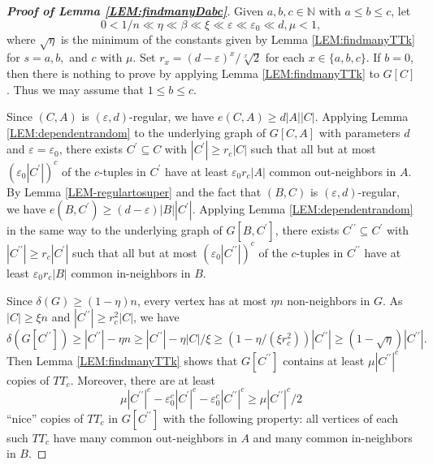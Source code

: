 \documentclass[11pt,a4paper,reqno]{amsart}
\theoremstyle{definition} %
\begin{document}
\begin{proof}[\textbf{Proof of Lemma \ref{LEM:findmanyDabc}}]
Given $a,b,c\in \mathbb{N}$ with $a\leqslant b \leqslant c$, let
$$0<1/n\ll \eta \ll \beta\ll \xi \ll \varepsilon\ll \varepsilon_0\ll d,\mu <1,$$
where $\sqrt \eta$ is the minimum of the constants given by Lemma \ref{LEM:findmanyTTk} for $s=a,b,$ and $c$ with $\mu$. Set $r_x=(d-\varepsilon)^x/\sqrt[x]{2}$ for each $x\in\{a,b,c\}$. If $b=0$, then there is nothing to prove by applying Lemma \ref{LEM:findmanyTTk} to $G[C]$. Thus we may  assume that $1\leqslant b\leqslant c$.
 
Since $(C,A)$ is $(\varepsilon,d)$-regular, we have $e(C,A) \geqslant d|A||C|$. Applying Lemma \ref{LEM:dependentrandom} to the underlying graph of $G[C,A]$ with parameters $d$ and $\varepsilon=\varepsilon_0$, there exists $C^{\prime}\subseteq C$ with $|C^{\prime}| \geqslant r_c |C|$ such that all but at most $(\varepsilon_0 |C^{\prime}|)^c$ of the $c$-tuples in $C^{\prime}$ have at least $\varepsilon_0 r_c |A|$ common out-neighbors in $A$. By Lemma \ref{LEM-regulartosuper} and the fact that $(B,C)$ is $(\varepsilon,d)$-regular, we have $e(B,C^{\prime})\geqslant (d-\varepsilon)|B||C^{\prime}|$. Applying Lemma \ref{LEM:dependentrandom} in the same way to the underlying graph of $G[B,C^\prime]$, there exists $C^{\prime\prime}\subseteq C^{\prime}$ with $|C^{\prime\prime}| \geqslant r_c |C^{\prime}|$ such that all but at most $(\varepsilon_0 |C^{\prime\prime}|)^c$ of the $c$-tuples in $C^{\prime\prime}$ have at least $\varepsilon_0 r_c |B|$ common in-neighbors in $B$.

Since $\delta(G)\geqslant (1-\eta)n$, every vertex has at most $\eta n$ non-neighbors in $G$. As $|C|\geqslant \xi n$ and $|C^{\prime\prime}|\geqslant r_c^2|C|$, we have $\delta(G[C^{\prime\prime}]) \geqslant |C^{\prime\prime}|-\eta n \geqslant |C^{\prime\prime}|-\eta|C|/\xi \geqslant (1-\eta/(\xi r_c^2))|C^{\prime\prime}| \geqslant (1-\sqrt \eta)|C^{\prime\prime}|.$ 
Then Lemma \ref{LEM:findmanyTTk} shows that $G[C^{\prime\prime}]$ contains at least $\mu|C^{\prime\prime}|^c$ copies of $TT_c$. Moreover, there are at least
$$\mu |C^{\prime\prime}|^c-\varepsilon_0^c |C^{\prime}|^c-\varepsilon_0^c |C^{\prime\prime}|^c  \geqslant \mu |C^{\prime\prime}|^c/2$$
``nice'' copies of $TT_c$ in $G[C^{\prime\prime}]$ with the following property: all vertices of each such $TT_c$ have many common out-neighbors in $A$ and many common in-neighbors in $B$.
    

\end{proof}
\end{document}
